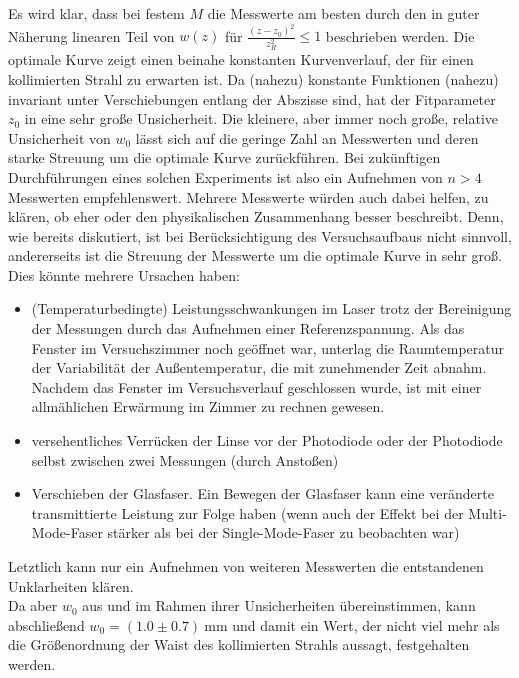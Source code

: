 \documentclass[11pt,a4paper,oneside]{scrartcl}
\begin{document}
Es wird klar, dass bei festem $M$ die Messwerte am besten durch den in guter Näherung linearen Teil von $w(z)$ für $\frac{(z-z_0)^2}{z_R^2}\leq1$ beschrieben werden. Die optimale Kurve zeigt einen beinahe konstanten Kurvenverlauf, der für einen kollimierten Strahl zu erwarten ist. Da (nahezu) konstante Funktionen (nahezu) invariant unter Verschiebungen entlang der Abszisse sind, hat der Fitparameter $z_0$ in  eine sehr große Unsicherheit. Die kleinere, aber immer noch große, relative Unsicherheit von $w_0$ lässt sich auf die geringe Zahl an Messwerten und deren starke Streuung um die optimale Kurve zurückführen. Bei zukünftigen Durchführungen eines solchen Experiments ist also ein Aufnehmen von $n>4$ Messwerten empfehlenswert. Mehrere Messwerte würden auch dabei helfen, zu klären, ob eher  oder  den physikalischen Zusammenhang besser beschreibt. Denn, wie bereits diskutiert, ist  bei Berücksichtigung des Versuchsaufbaus nicht sinnvoll, andererseits ist die Streuung der Messwerte um die optimale Kurve in  sehr groß. Dies könnte mehrere Ursachen haben:
\begin{itemize}
\item (Temperaturbedingte) Leistungsschwankungen im Laser trotz der Bereinigung der Messungen durch das Aufnehmen einer Referenzspannung. Als das Fenster im Versuchszimmer noch geöffnet war, unterlag die Raumtemperatur der Variabilität der Außentemperatur, die mit zunehmender Zeit abnahm. Nachdem das Fenster im Versuchsverlauf geschlossen wurde, ist mit einer allmählichen Erwärmung im Zimmer zu rechnen gewesen. 
\item versehentliches Verrücken der Linse vor der Photodiode oder der Photodiode selbst zwischen zwei Messungen (durch Anstoßen)
\item Verschieben der Glasfaser. Ein Bewegen der Glasfaser kann eine veränderte transmittierte Leistung zur Folge haben (wenn auch der Effekt bei der Multi-Mode-Faser stärker als bei der Single-Mode-Faser zu beobachten war)
\end{itemize}
Letztlich kann nur ein Aufnehmen von weiteren Messwerten die entstandenen Unklarheiten klären.\\
Da aber $w_0$ aus  und  im Rahmen ihrer Unsicherheiten übereinstimmen, kann abschließend $w_0=(1.0\pm0.7)\ \mathrm{mm}$ und damit ein Wert, der nicht viel mehr als die Größenordnung der Waist des kollimierten Strahls aussagt, festgehalten werden. 
\end{document}
